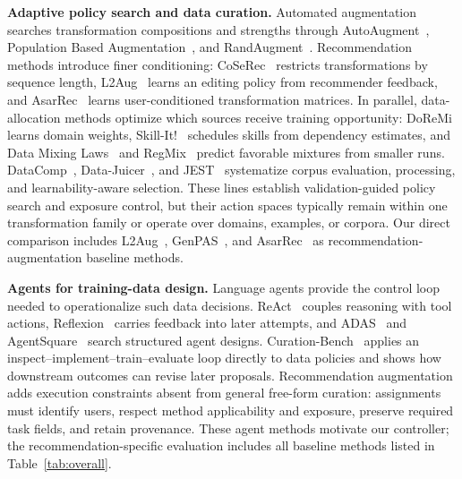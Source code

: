 \textbf{Adaptive policy search and data curation.} Automated augmentation searches transformation compositions and strengths through AutoAugment~\citep{cubuk2019autoaugment}, Population Based Augmentation~\citep{ho2019pba}, and RandAugment~\citep{cubuk2020randaugment}. Recommendation methods introduce finer conditioning: CoSeRec~\citep{liu2021coserec} restricts transformations by sequence length, L2Aug~\citep{wang2022l2aug} learns an editing policy from recommender feedback, and AsarRec~\citep{zhang2026asarrec} learns user-conditioned transformation matrices. In parallel, data-allocation methods optimize which sources receive training opportunity: DoReMi~\citep{xie2023doremi} learns domain weights, Skill-It!~\citep{chen2023skillit} schedules skills from dependency estimates, and Data Mixing Laws~\citep{ye2024mixinglaws} and RegMix~\citep{liu2024regmix} predict favorable mixtures from smaller runs. DataComp~\citep{gadre2023datacomp}, Data-Juicer~\citep{chen2024datajuicer}, and JEST~\citep{evans2024jest} systematize corpus evaluation, processing, and learnability-aware selection. These lines establish validation-guided policy search and exposure control, but their action spaces typically remain within one transformation family or operate over domains, examples, or corpora. Our direct comparison includes L2Aug~\citep{wang2022l2aug}, GenPAS~\citep{lee2025genpas}, and AsarRec~\citep{zhang2026asarrec} as recommendation-augmentation baseline methods.

\textbf{Agents for training-data design.} Language agents provide the control loop needed to operationalize such data decisions. ReAct~\citep{yao2023react} couples reasoning with tool actions, Reflexion~\citep{shinn2023reflexion} carries feedback into later attempts, and ADAS~\citep{hu2025adas} and AgentSquare~\citep{shang2025agentsquare} search structured agent designs. Curation-Bench~\citep{kang2026curation} applies an inspect--implement--train--evaluate loop directly to data policies and shows how downstream outcomes can revise later proposals. Recommendation augmentation adds execution constraints absent from general free-form curation: assignments must identify users, respect method applicability and exposure, preserve required task fields, and retain provenance. These agent methods motivate our controller; the recommendation-specific evaluation includes all baseline methods listed in Table~\ref{tab:overall}.

